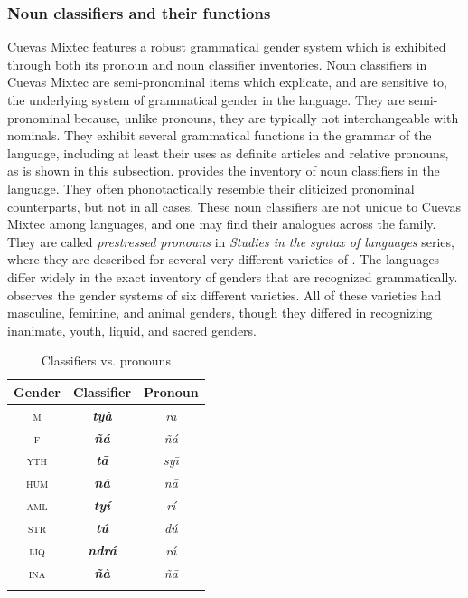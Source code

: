 \documentclass[output=paper,modfonts,nonflat]{langsci/langscibook}
\begin{document}
\subsubsection{Noun classifiers and their functions} \label{sec:cisneros:3.3.3}

Cuevas Mixtec features a robust grammatical gender system which is exhibited through both its pronoun and noun classifier inventories.  Noun classifiers in Cuevas Mixtec are semi-pronominal items which explicate, and are sensitive to, the underlying system of grammatical gender in the language.  They are semi-pronominal because, unlike pronouns, they are typically not interchangeable with nominals.  They exhibit several grammatical functions in the grammar of the language, including at least their uses as definite articles and relative pronouns, as is shown in this subsection.  provides the inventory of noun classifiers in the language. They often phonotactically resemble their cliticized pronominal counterparts, but not in all cases.  These noun classifiers are not unique to Cuevas Mixtec among  languages, and one may find their analogues across the family.  They are called \textit{prestressed pronouns} in  \textit{Studies in the syntax of  languages} series, where they are described for several very different varieties of .  The  languages differ widely in the exact inventory of genders that are recognized grammatically.  \citet{Macri1983} observes the gender systems of six different  varieties.  All of these varieties had masculine, feminine, and animal genders, though they differed in recognizing inanimate, youth, liquid, and sacred genders.

\begin{table}
\begin{tabularx}{.5\textwidth}{CCC} 
\lsptoprule
Gender & Classifier & Pronoun\\
\midrule
\textsc{m} & \textit{\textbf{ty\`a}} & \textit{r\=a} \\
\textsc{f} & \textit{\textbf{\~n\'a}} & \textit{\~n\'a} \\
\textsc{yth} & \textit{\textbf{t\=a}} & \textit{sy\=\i} \\
\textsc{hum} & \textit{\textbf{n\`a}} & \textit{n\=a} \\
\textsc{aml} & \textit{\textbf{ty\'i}} & \textit{r\'i} \\
\textsc{str} & \textit{\textbf{t\'u}} & \textit{d\'u} \\
\textsc{liq} & \textit{\textbf{ndr\'a}} & \textit{r\'a} \\
\textsc{ina} & \textit{\textbf{\~n\`a}} & \textit{\~n\=a} \\
\lspbottomrule
\end{tabularx}
\caption{Classifiers vs. pronouns}
\label{tab:cisneros:2}
\end{table}
\end{document}
